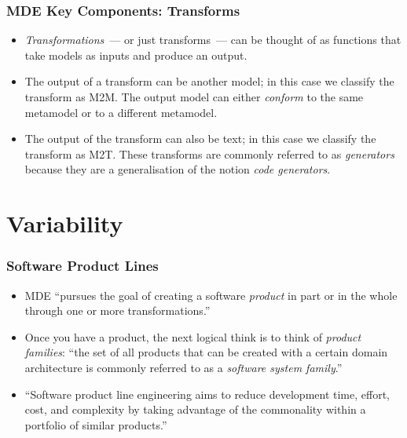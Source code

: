 \documentclass{beamer}
\begin{document}
\begin{frame}
\frametitle{\ac{MDE} Key Components: Transforms}

\begin{itemize}
\item \emph{Transformations}~--- or just transforms~--- can be thought
  of as functions that take models as inputs and produce an output.

\pause

\item The output of a transform can be another model; in this case we
  classify the transform as \acf{M2M}. The output model can either
  \emph{conform} to the same metamodel or to a different metamodel.

\pause

\item The output of the transform can also be text; in this case we
  classify the transform as \acf{M2T}. These transforms are commonly
  referred to as \emph{generators} because they are a generalisation
  of the notion \emph{code generators}.

\end{itemize}

\end{frame}

\section{Variability}

\begin{frame}
\frametitle{Software Product Lines}

\begin{itemize}

\item \ac{MDE} ``pursues the goal of creating a software
  \emph{product} in part or in the whole through one or more
  transformations.''\cite{volter2013model}

\pause

\item Once you have a product, the next logical think is to think of
  \emph{product families}: ``the set of all products that can be
  created with a certain domain architecture is commonly referred to
  as a \emph{software system family}.''\cite{volter2013model}

\pause

\item ``Software product line engineering aims to reduce development
  time, effort, cost, and complexity by taking advantage of the
  commonality within a portfolio of similar
  products.''\cite{voelter2007handling}

\end{itemize}

\end{frame}
\end{document}
